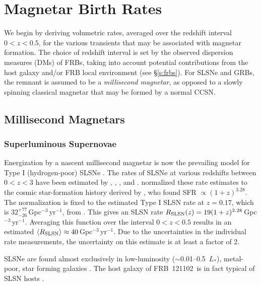 \documentclass[twocolumn]{aastex6}
\newcommand{\apx}{\ensuremath{\sim}}
\newcommand{\repeater}{FRB~121102}
\begin{document}
\section{Magnetar Birth Rates}
\label{s:rates}

We begin by deriving volumetric rates, averaged over the redshift interval $0<z<0.5$, for the various transients that may be associated with magnetar formation. The choice of redshift interval is set by the observed dispersion measures (DMs) of FRBs, taking into account potential contributions from the host galaxy and/or FRB local environment (see \S\ref{s:frbs}). For SLSNe and GRBs, the remnant is assumed to be a \emph{millisecond magnetar}, as opposed to a slowly spinning classical magnetar that may be formed by a normal CCSN.

\subsection{Millisecond Magnetars}

\subsubsection{Superluminous Supernovae}

Energization by a nascent millisecond magnetar is now the prevailing model for Type I (hydrogen-poor) SLSNe \citep[see most recently][]{nic2016c, nic2017, nic2017b, kan2016b, ins2016b}. The rates of SLSNe at various redshifts between $0<z<3$ have been estimated by \citet{qui2013}, \citet{coo2012}, \citet{mcc2015}, and \citet{pss+.2017}. \citet{pss+.2017} normalized these rate estimates to the cosmic star-formation history derived by \citet{hb.2006, hb.2008}, who found SFR $\propto (1+z)^{3.28}$. The normalization is fixed to the estimated Type I SLSN rate at $z=0.17$, which is $32_{-26}^{+77}$\,Gpc$^{-3}$\,yr$^{-1}$, from \citet{qui2013}. This gives an SLSN rate $R_{\rm SLSN}(z)=19 (1+z)^{3.28}$\,Gpc$^{-3}$\,yr$^{-1}$. Averaging this function over the interval $0<z<0.5$ results in an estimated $\langle R_{\rm SLSN} \rangle \approx 40$\,Gpc$^{-3}$\,yr$^{-1}$. Due to the uncertainties in the individual rate measurements, the uncertainty on this estimate is at least a factor of 2.

SLSNe are found almost exclusively in low-luminosity (\apx0.01--0.5~$L_*$), metal-poor, star forming galaxies \citep{lun2014, lel2015, chen2016, per2016, ang2016,schu2016}. The host galaxy of \repeater\ is in fact typical of SLSN hosts \citep{mbm.2017}.
\end{document}
